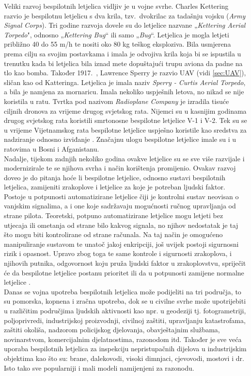 \documentclass[times, utf8, diplomski]{fer}
\begin{document}
Veliki razvoj bespilotnih letjelica vidljiv je u vojne svrhe. Charles  Kettering  razvio  je  bespilotnu  letjelicu  s  dva  krila, tzv.~dvokrilac za tadašnju vojsku (\emph{Army Signal Corps}). Tri godine razvoja dovele su do letjelice nazvane „\emph{Kettering Aerial Torpedo}", odnosno „\emph{Kettering Bug}“ ili samo „\emph{Bug}“. Letjelica je mogla letjeti približno 40 do 55 m/h te nositi oko 80 kg teškog eksploziva. Bila usmjerena prema cilju sa svojim postavkama i imala  je  odvojiva  krila  koja  bi  se ispustila u  trenutku kada  bi  letjelica  bila iznad  mete dopuštajući trupu aviona da padne na tlo kao bomba.  Također 1917.~, Lawrence Sperry je razvio UAV (vidi \ref{sec:UAV}), sličan kao od Katteringa. Letjelica je imala naziv \emph{Sperry - Curtis Aerial Torpedo}, a bila je namjena za mornaricu. Imala nekoliko uspješnih letova, no nikad se nije koristila u ratu. Tvrtka pod nazivom \emph{Radioplane Company} je izradila tisuće ciljnih dronova  za vrijeme drugog svjetskog rata. Nijemci su u kasnijim godinama drugog svjetskog rata koristili smrtonosne bespilotne letjelice V-1 i V-2. Tek su se u vrijeme Vijetnamskog rata bespilotne letjelice uspješno koristile kao sredstva za nadziranje odnosno izviđanje \citep{UAVSystems}. Značajnu ulogu bespilotne letjelice imale su i u ratovima u Bosni i Afganistanu.\\
Nadalje, tijekom zadnjih nekoliko godina ovakve letjelice su se sve više razvijale i modernizirale te se njihova svrha i način korištenja promijenio. Ovakav razvoj doveo je do pitanja hoće li bespilotne letjelice, odnosno sustavi bespilotnih letjelica, zamijeniti zrakoplove i letjelice za koje je potreban ljudski faktor. Postoje u potpunosti automatizirane letjelice čiji je kontrolni sustav neovisan o vanjskim signalima, a i one koje sadržavaju mogućnosti ručnog upravljanja  od  strane  pilota.  Teoretski,  potpuno  automatizirane  letjelice  mogu  letjeti  bez utjecaja ili ometanja od strane bilo kakvog signala, no njihov nedostatak je taj što mogu biti kontrolirane od strane računala. Na taj način je omogućeno manipuliranje sustavom te unatoč jakoj enkripciji,  još  uvijek  postoji  sigurnosni  rizik  i  opasnost.  Upravo  zbog  toga  te  same kontrole  i  sigurnosti  zrakoplova, i njihovih putnika, odgovornost koju pruža ljudski faktor u zrakoplovstvu, spriječit će da bespilotne letjelice postanu prioritet ili da u potpunosti zamijene normalne letjelice \citep{UAVSystems}.\\
Danas se vojna upotreba bespilotnih letjelica može podijeliti na tri područja, to su pomorska, kopnena i zračna upotreba, dok se u civilne  svrhe  može  upotrijebiti  u  različitim  područjima ljudskih  aktivnosti  kao  npr.  u  geodeziji  tj. fotogrametriji,   poljoprivredi,   industrijskoj proizvodnji,  civilnoj  zaštiti,  upravljanju katastrofama,  zaštiti  okoliša,  nadzorom policijskog    djelovanja,    obavještajnim službama,   novinarstvom,   komercijalnim djelatnostima, razonodom itd. Također  je  sve  veća  uporaba  bespilotnih letjelica za inspekciju   nepristupačnih dijelova  u industrijskim  objektima  kao  što su: brane, dalekovodi, visoki dimnjaci, cjevovodi, mostovi i dr. Isto tako sve popularniji i mali modeli namijenjeni za razonodu.
\end{document}
